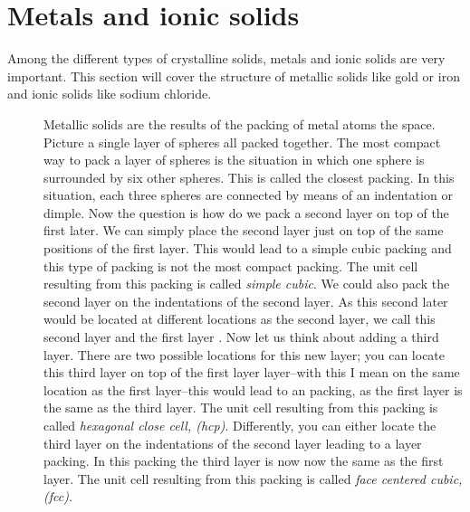 \documentclass[main.tex]{subfiles}
\newcommand\chapterlabel{solids}
\begin{document}
\section{Metals and ionic solids}
Among the different types of crystalline solids, metals and ionic solids are very important. This section will cover the structure of metallic solids like gold or iron and ionic solids like sodium chloride.
\sloppy 
\begin{description}
   


\item[] Metallic solids are the results of the packing of metal atoms the space. Picture a single layer of spheres all packed together.  
The most compact way to pack a layer of spheres is the situation in which one sphere is surrounded by six other spheres. This is called the closest packing. In this situation, each three spheres are connected by means of an indentation or dimple. Now the question is how do we pack a second layer on top of the first later. We can simply place the second layer just on top of the same positions of the first layer. This would lead to a simple cubic packing and this type of packing is not the most compact packing. The unit cell resulting from this packing is called \emph{simple cubic}. We could also pack the second layer on the indentations of the second layer. As this second later would be located at different locations as the second layer, we call this second layer  and the first layer .
Now let us think about adding a third layer. There are two possible locations for this new layer; you can locate this third layer on top of the first layer layer--with this I mean on the same location as the first layer--this would lead to an  packing, as the first layer is the same as the third layer. The unit cell resulting from this packing is called \emph{hexagonal close cell, (hcp)}. Differently, you can either locate the third layer on the indentations of the second layer leading to a  layer packing. In this packing the third layer is now now the same as the first layer. The unit cell resulting from this packing is called \emph{face centered cubic, (fcc)}. 


\vspace{-1cm}
     \label{Fig:{\chapterlabel}\thefigurenewcounter}
\begin{center}
\end{center}
\end{description}
\end{document}
